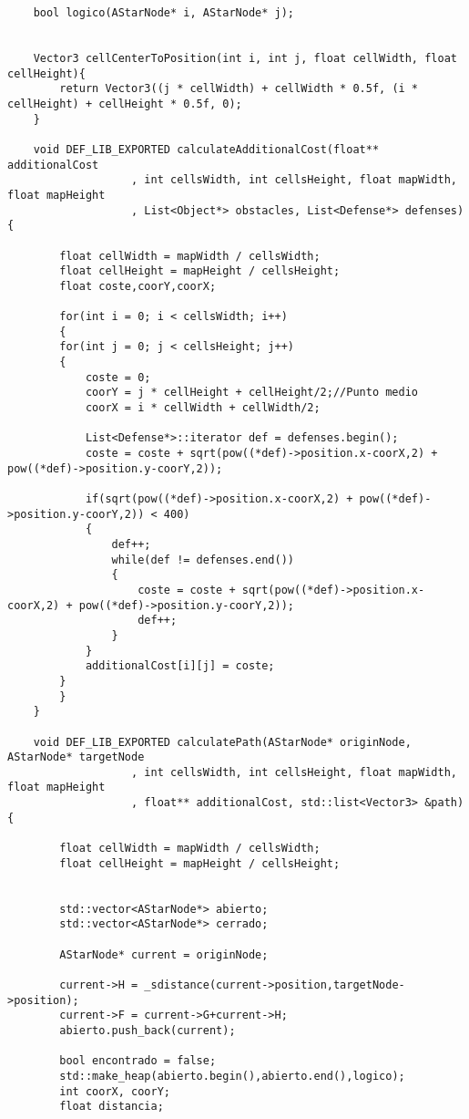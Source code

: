 

\lstset{language = c++}

\begin{lstlisting}
	bool logico(AStarNode* i, AStarNode* j);


	Vector3 cellCenterToPosition(int i, int j, float cellWidth, float cellHeight){
	    return Vector3((j * cellWidth) + cellWidth * 0.5f, (i * cellHeight) + cellHeight * 0.5f, 0);
	}

	void DEF_LIB_EXPORTED calculateAdditionalCost(float** additionalCost
		           , int cellsWidth, int cellsHeight, float mapWidth, float mapHeight
		           , List<Object*> obstacles, List<Defense*> defenses) {
	    
	    float cellWidth = mapWidth / cellsWidth;
	    float cellHeight = mapHeight / cellsHeight;
	    float coste,coorY,coorX;
	    
	    for(int i = 0; i < cellsWidth; i++)
	    {
		for(int j = 0; j < cellsHeight; j++)
		{
		    coste = 0;
		    coorY = j * cellHeight + cellHeight/2;//Punto medio
		    coorX = i * cellWidth + cellWidth/2;
		
		    List<Defense*>::iterator def = defenses.begin();
		    coste = coste + sqrt(pow((*def)->position.x-coorX,2) + pow((*def)->position.y-coorY,2));

		    if(sqrt(pow((*def)->position.x-coorX,2) + pow((*def)->position.y-coorY,2)) < 400)
		    {
		        def++;
		        while(def != defenses.end())
		        {
		            coste = coste + sqrt(pow((*def)->position.x-coorX,2) + pow((*def)->position.y-coorY,2));
		            def++;
		        }
		    }
		    additionalCost[i][j] = coste;
		}
	    }
	}

	void DEF_LIB_EXPORTED calculatePath(AStarNode* originNode, AStarNode* targetNode
		           , int cellsWidth, int cellsHeight, float mapWidth, float mapHeight
		           , float** additionalCost, std::list<Vector3> &path) {

	    float cellWidth = mapWidth / cellsWidth;
	    float cellHeight = mapHeight / cellsHeight;
	    
	    
	    std::vector<AStarNode*> abierto;
	    std::vector<AStarNode*> cerrado;

	    AStarNode* current = originNode;

	    current->H = _sdistance(current->position,targetNode->position);
	    current->F = current->G+current->H;
	    abierto.push_back(current);

	    bool encontrado = false;
	    std::make_heap(abierto.begin(),abierto.end(),logico);
	    int coorX, coorY;
	    float distancia;
	    

\end{lstlisting}
